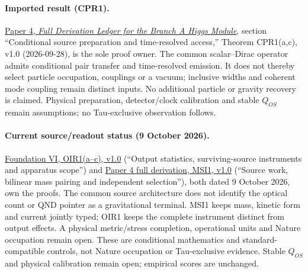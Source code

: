 \documentclass[11pt]{article}
\begin{document}
\paragraph{Imported result (CPR1).}
\href{https://github.com/tau-core-research/tau-core-higgs-module-paper4/blob/main/paper4_full_derivation/full_derivation.pdf#nameddest=cpr1}{Paper 4, \emph{Full Derivation Ledger for the Branch A Higgs Module}}, section ``Conditional source preparation and time-resolved access,'' Theorem CPR1(a,c), v1.0 (2026-09-28), is the sole proof owner.
The common scalar--Dirac operator admits conditional pair transfer and time-resolved emission. It does not thereby select particle occupation, couplings or a vacuum; inclusive widths and coherent mode coupling remain distinct inputs. No additional particle or gravity recovery is claimed.
Physical preparation, detector/clock calibration and stable $Q_{OS}$ remain assumptions; no Tau-exclusive observation follows.

\paragraph{Current source/readout status (9 October 2026).}
\href{https://github.com/tau-core-research/tau-core-quantum-readout-foundation-paper-vi/blob/main/paperVI_submission_source/main.pdf#nameddest=oir1}{Foundation VI, OIR1(a--c), v1.0} (``Output statistics, surviving-source instruments and apparatus scope'') and \href{https://github.com/tau-core-research/tau-core-higgs-module-paper4/blob/main/paper4_full_derivation/full_derivation.pdf#nameddest=msi1}{Paper 4 full derivation, MSI1, v1.0} (``Source work, bilinear mass pairing and independent selection''), both dated 9 October 2026, own the proofs.
The common source architecture does not identify the optical count or QND pointer as a gravitational terminal. MSI1 keeps mass, kinetic form and current jointly typed; OIR1 keeps the complete instrument distinct from output effects. A physical metric/stress completion, operational units and Nature occupation remain open.
These are conditional mathematics and standard-compatible controls, not Nature occupation or Tau-exclusive evidence. Stable $Q_{OS}$ and physical calibration remain open; empirical scores are unchanged.
\end{document}
